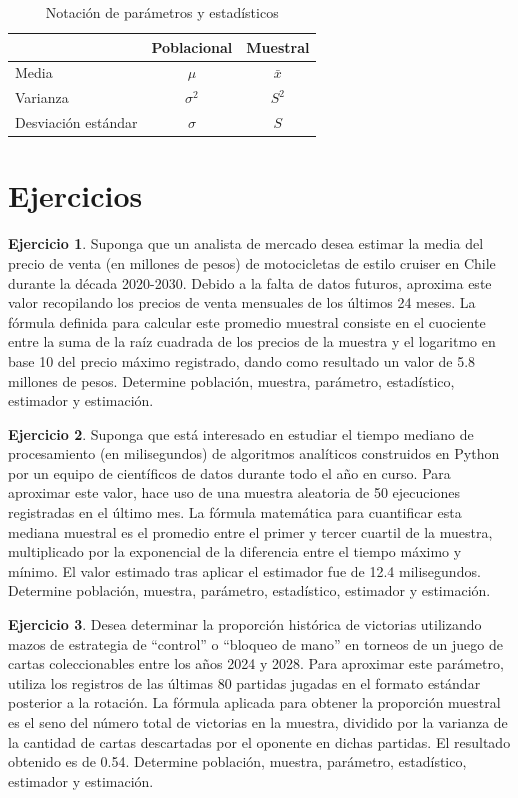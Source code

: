 \documentclass[
  11pt,
]{book}
\theoremstyle{definition}
\theoremstyle{definition}
\theoremstyle{definition}
\newtheorem{exercise}{Ejercicio}[chapter]
\theoremstyle{definition}
\theoremstyle{remark}
\begin{document}
\begin{table}[H]
\centering
\caption{\label{tab:notacion}Notación de parámetros y estadísticos}
\centering
\begin{tabular}[t]{lcc}
\toprule
  & Poblacional & Muestral\\
\midrule
Media & $\mu$ & $\bar{x}$\\
Varianza & $\sigma^2$ & $S^2$\\
Desviación estándar & $\sigma$ & $S$\\
\bottomrule
\end{tabular}
\end{table}

\section{Ejercicios}\label{ejercicios}

\begin{exercise}
Suponga que un analista de mercado desea estimar la media del precio de venta (en millones de pesos) de motocicletas de estilo cruiser en Chile durante la década 2020-2030. Debido a la falta de datos futuros, aproxima este valor recopilando los precios de venta mensuales de los últimos 24 meses. La fórmula definida para calcular este promedio muestral consiste en el cuociente entre la suma de la raíz cuadrada de los precios de la muestra y el logaritmo en base 10 del precio máximo registrado, dando como resultado un valor de 5.8 millones de pesos. Determine población, muestra, parámetro, estadístico, estimador y estimación.
\end{exercise}

\begin{exercise}
Suponga que está interesado en estudiar el tiempo mediano de procesamiento (en milisegundos) de algoritmos analíticos construidos en Python por un equipo de científicos de datos durante todo el año en curso. Para aproximar este valor, hace uso de una muestra aleatoria de 50 ejecuciones registradas en el último mes. La fórmula matemática para cuantificar esta mediana muestral es el promedio entre el primer y tercer cuartil de la muestra, multiplicado por la exponencial de la diferencia entre el tiempo máximo y mínimo. El valor estimado tras aplicar el estimador fue de 12.4 milisegundos. Determine población, muestra, parámetro, estadístico, estimador y estimación.
\end{exercise}

\begin{exercise}
Desea determinar la proporción histórica de victorias utilizando mazos de estrategia de ``control'' o ``bloqueo de mano'' en torneos de un juego de cartas coleccionables entre los años 2024 y 2028. Para aproximar este parámetro, utiliza los registros de las últimas 80 partidas jugadas en el formato estándar posterior a la rotación. La fórmula aplicada para obtener la proporción muestral es el seno del número total de victorias en la muestra, dividido por la varianza de la cantidad de cartas descartadas por el oponente en dichas partidas. El resultado obtenido es de 0.54. Determine población, muestra, parámetro, estadístico, estimador y estimación.
\end{exercise}
\end{document}
